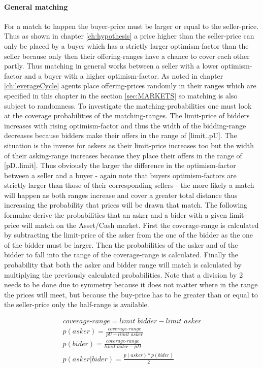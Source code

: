 \documentclass[Bachelorarbeit.tex]{subfiles}
\begin{document}
\paragraph{General matching}
For a match to happen the buyer-price must be larger or equal to the seller-price. Thus as shown in chapter \ref{ch:hypothesis} a price higher than the seller-price can only be placed by a buyer which has a strictly larger optimism-factor than the seller because only then their offering-ranges have a chance to cover each other partly. Thus matching in general works between a seller with a lower optimism-factor and a buyer with a higher optimism-factor. As noted in chapter \ref{ch:leverageCycle} agents place offering-prices randomly in their ranges which are specified in this chapter in the section \ref{sec:MARKETS} so matching is also subject to randomness.
\medskip
To investigate the matching-probabilities one must look at the coverage probabilities of the matching-ranges. The limit-price of bidders increases with rising optimism-factor and thus the width of the bidding-range decreases because bidders make their offers in the range of [limit..pU]. The situation is the inverse for askers as their limit-price increases too but the width of their asking-range increases because they place their offers in the range of [pD..limit]. Thus obviously the larger the difference in the optimism-factor between a seller and a buyer - again note that buyers optimism-factors are strictly larger than those of their corresponding sellers - the more likely a match will happen as both ranges increase and cover a greater total distance thus increasing the probability that prices will be drawn that match.
\medskip
The following formulae derive the probabilities that an asker and a bider with a given limit-price will match on the Asset/Cash market. First the coverage-range is calculated by subtracting the limit-price of the asker from the one of the bidder as the one of the bidder must be larger. Then the probabilities of the asker and of the bidder to fall into the range of the coverage-range is calculated. Finally the probability that both the asker and bidder range will match is calculated by multiplying the previously calculated probabilities. Note that a division by 2 needs to be done due to symmetry because it does not matter where in the range the prices will meet, but because the buy-price has to be greater than or equal to the seller-price only the half-range is available.

\begin{equation}
\begin{split}
\textit{coverage-range} = \textit{limit bidder} - \textit{limit asker} \\
p(asker) = \frac{\textit{coverage-range}}{ pU - \textit{limit asker} } \\
p(bider) = \frac{\textit{coverage-range}}{ \textit{limit bider} - pD } \\
p(asker | bider) = \frac{p(asker) * p(bider)}{2}
\end{split}
\end{equation}
\end{document}
